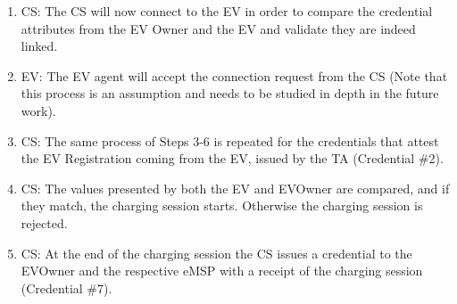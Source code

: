 \begin{enumerate}
    \item CS: The CS will now connect to the EV in order to compare the credential attributes from the EV Owner and the EV and validate they are indeed linked.
    \item EV: The EV agent will accept the connection request from the CS (Note that this process is an assumption and needs to be studied in depth in the future work).
    \item CS: The same process of Steps 3-6 is repeated for the credentials that attest the EV Registration coming from the EV, issued by the TA (Credential \#2).
    \item CS: The values presented by both the EV and EVOwner are compared, and if they match, the charging session starts. Otherwise the charging session is rejected.
    \item CS: At the end of the charging session the CS issues a credential to the EVOwner and the respective eMSP with a receipt of the charging session (Credential \#7).
\end{enumerate}

